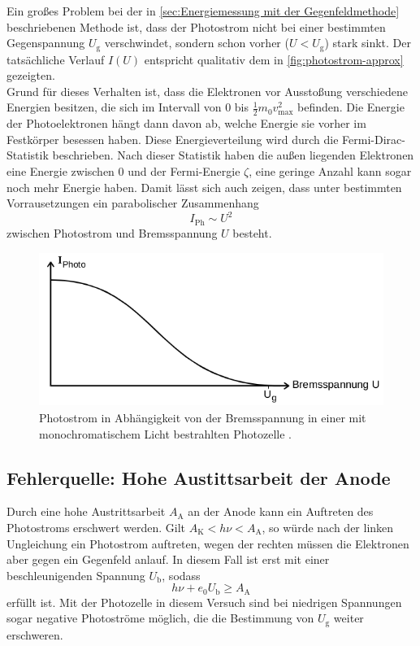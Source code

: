 Ein großes Problem bei der in \autoref{sec:Energiemessung mit der Gegenfeldmethode}
beschriebenen Methode ist, dass der Photostrom nicht bei einer bestimmten Gegenspannung
$U_\text{g}$ verschwindet, sondern schon vorher ($U < U_\text{g}$) stark sinkt. Der
tatsächliche Verlauf $I(U)$ entspricht qualitativ dem in \autoref{fig:photostrom-approx}
gezeigten.
\\
Grund für dieses Verhalten ist, dass die Elektronen vor Ausstoßung verschiedene Energien
besitzen, die sich im Intervall von $0$ bis $\frac12 m_0 v_\text{max}^2$ befinden. Die
Energie der Photoelektronen hängt dann davon ab, welche Energie sie vorher im Festkörper
besessen haben. Diese Energieverteilung wird durch die Fermi-Dirac-Statistik beschrieben.
Nach dieser Statistik haben die außen liegenden Elektronen eine Energie zwischen $0$ und
der Fermi-Energie $\zeta$, eine geringe Anzahl kann sogar noch mehr Energie haben. Damit
lässt sich auch zeigen, dass unter bestimmten Vorrausetzungen ein parabolischer
Zusammenhang
\[
	I_\text{Ph} \sim U^2
\]
zwischen Photostrom und Bremsspannung $U$ besteht.

\begin{figure}
	\centering
	\includegraphics[height=5cm]{pictures/photostrom.png}
	\caption{Photostrom in Abhängigkeit von der Bremsspannung in einer mit monochromatischem Licht
	bestrahlten Photozelle \cite{anleitung}.}
	\label{fig:photostrom-approx}
\end{figure}

\subsection{Fehlerquelle: Hohe Austittsarbeit der Anode}
\label{sec:Fehlerquelle: Hohe Austittsarbeit der Anode}

Durch eine hohe Austrittsarbeit $A_\text{A}$ an der Anode kann ein Auftreten des Photostroms erschwert
werden. Gilt $A_\text{K} < h\nu < A_\text{A}$, so würde nach der linken Ungleichung ein
Photostrom auftreten, wegen der rechten müssen die Elektronen aber gegen ein Gegenfeld
anlauf. In diesem Fall ist erst mit einer beschleunigenden Spannung $U_\text{b}$, sodass
\[
	h\nu + e_0 U_\text{b} \geq A_\text{A}
\]
erfüllt ist. Mit der Photozelle in diesem Versuch sind bei niedrigen Spannungen sogar
negative Photoströme möglich, die die Bestimmung von $U_\text{g}$ weiter erschweren.

